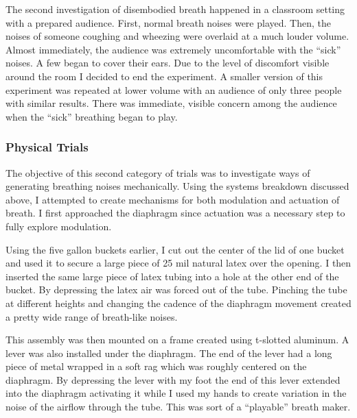 \documentclass[letterpaper]{article}
\begin{document}
The second investigation of disembodied breath happened in a classroom setting with a prepared audience. First, normal breath noises were played. Then, the noises of someone coughing and wheezing were overlaid at a much louder volume. Almost immediately, the audience was extremely uncomfortable with the ``sick'' noises. A few began to cover their ears. Due to the level of discomfort visible around the room I decided to end the experiment. A smaller version of this experiment was repeated at lower volume with an audience of only three people with similar results. There was immediate, visible concern among the audience when the ``sick'' breathing began to play.

\subsubsection{Physical Trials}

The objective of this second category of trials was to investigate ways of generating breathing noises mechanically. Using the systems breakdown discussed above, I attempted to create mechanisms for both modulation and actuation of breath. I first approached the diaphragm since actuation was a necessary step to fully explore modulation.

Using the five gallon buckets earlier, I cut out the center of the lid of one bucket and used it to secure a large piece of 25 mil natural latex over the opening. I then inserted the same large piece of latex tubing into a hole at the other end of the bucket. By depressing the latex air was forced out of the tube. Pinching the tube at different heights and changing the cadence of the diaphragm movement created a pretty wide range of breath-like noises. 


This assembly was then mounted on a frame created using t-slotted aluminum. A lever was also installed under the diaphragm. The end of the lever had a long piece of metal wrapped in a soft rag which was roughly centered on the diaphragm. By depressing the lever with my foot the end of this lever extended into the diaphragm activating it while I used my hands to create variation in the noise of the airflow through the tube. This was sort of a ``playable'' breath maker. 
\end{document}
